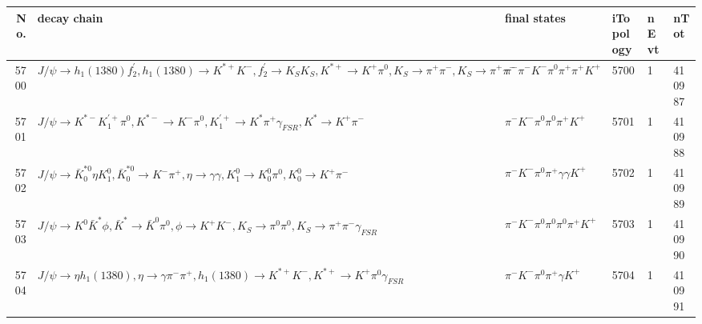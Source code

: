 \begin{table}[htbp] 
\begin{center}
\begin{small}
\begin{tabular}{rlllll}\hline\hline
 No. & decay chain & final states &  iTopology & nEvt & nTot \\\hline
5700&$J/\psi       \rightarrow h_{1}(1380)    f_2^{'}       , h_{1}(1380)     \rightarrow K^{*+}         K^{-}          , f_2^{'}        \rightarrow K_{S}          K_{S}          , K^{*+}          \rightarrow K^{+}          \pi^{0}        , K_{S}           \rightarrow \pi^{+}        \pi^{-}        , K_{S}           \rightarrow \pi^{+}        \pi^{-}        $&$\pi^{-}        \pi^{-}        K^{-}          \pi^{0}        \pi^{+}        \pi^{+}        K^{+}          $& 5700&    1&410987\\
5701&$J/\psi       \rightarrow K^{*-}         K_1^{'+}      \pi^{0}        , K^{*-}          \rightarrow K^{-}          \pi^{0}        , K_1^{'+}       \rightarrow K^{*}          \pi^{+}        \gamma_{FSR} , K^{*}           \rightarrow K^{+}          \pi^{-}        $&$\pi^{-}        K^{-}          \pi^{0}        \pi^{0}        \pi^{+}        K^{+}          $& 5701&    1&410988\\
5702&$J/\psi       \rightarrow \bar{K}_0^{*0}\eta          K_1^{0}        , \bar{K}_0^{*0} \rightarrow K^{-}          \pi^{+}        , \eta           \rightarrow \gamma       \gamma       , K_1^{0}         \rightarrow K_0^{0}        \pi^{0}        , K_0^{0}         \rightarrow K^{+}          \pi^{-}        $&$\pi^{-}        K^{-}          \pi^{0}        \pi^{+}        \gamma       \gamma       K^{+}          $& 5702&    1&410989\\
5703&$J/\psi       \rightarrow K^{0}          \bar{K}^{*}   \phi           , \bar{K}^{*}    \rightarrow \bar{K}^{0}   \pi^{0}        , \phi            \rightarrow K^{+}          K^{-}          , K_{S}           \rightarrow \pi^{0}        \pi^{0}        , K_{S}           \rightarrow \pi^{+}        \pi^{-}        \gamma_{FSR} $&$\pi^{-}        K^{-}          \pi^{0}        \pi^{0}        \pi^{0}        \pi^{+}        K^{+}          $& 5703&    1&410990\\
5704&$J/\psi       \rightarrow \eta          h_{1}(1380)    , \eta           \rightarrow \gamma       \pi^{-}        \pi^{+}        , h_{1}(1380)     \rightarrow K^{*+}         K^{-}          , K^{*+}          \rightarrow K^{+}          \pi^{0}        \gamma_{FSR} $&$\pi^{-}        K^{-}          \pi^{0}        \pi^{+}        \gamma       K^{+}          $& 5704&    1&410991\\

\end{tabular}
\end{small}
\end{center}
\end{table}
